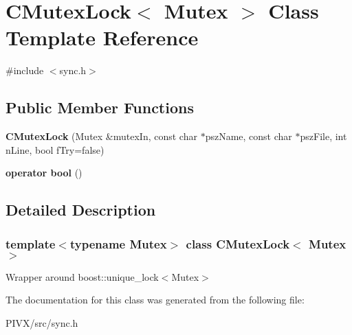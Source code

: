 \hypertarget{class_c_mutex_lock}{}\section{C\+Mutex\+Lock$<$ Mutex $>$ Class Template Reference}
\label{class_c_mutex_lock}


{\ttfamily \#include $<$sync.\+h$>$}

\subsection*{Public Member Functions}
\begin{DoxyCompactItemize}
\item 
\mbox{\label{class_c_mutex_lock_ad08e2df1cad4c5732dafb1552abe6106}} 
{\bfseries C\+Mutex\+Lock} (Mutex \&mutex\+In, const char $\ast$psz\+Name, const char $\ast$psz\+File, int n\+Line, bool f\+Try=false)
\item 
\mbox{\label{class_c_mutex_lock_a4358803c87a873252abebdd1b625d293}} 
{\bfseries operator bool} ()
\end{DoxyCompactItemize}


\subsection{Detailed Description}
\subsubsection*{template$<$typename Mutex$>$\newline
class C\+Mutex\+Lock$<$ Mutex $>$}

Wrapper around boost\+::unique\+\_\+lock$<$\+Mutex$>$ 

The documentation for this class was generated from the following file\+:\begin{DoxyCompactItemize}
\item 
P\+I\+V\+X/src/sync.\+h\end{DoxyCompactItemize}
